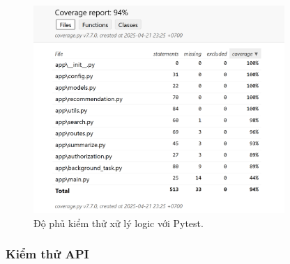 \begin{figure}[H]
    \centering  
    \includegraphics[width=0.85\textwidth]{figures/c4/unittest.png}
    \caption{Độ phủ kiểm thử xử lý logic với Pytest.}
    \label{fig:pytest-testing}
\end{figure}


\subsubsection{Kiểm thử API}

